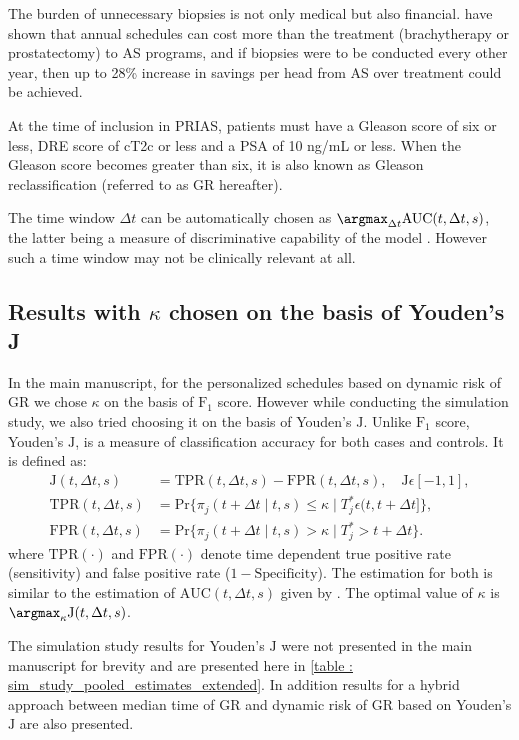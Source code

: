 The burden of unnecessary biopsies is not only medical but also financial. \citet{keegan2012active} have shown that annual schedules can cost more than the treatment (brachytherapy or prostatectomy) to AS programs, and if biopsies were to be conducted every other year, then up to 28\% increase in savings per head from AS over treatment could be achieved.

At the time of inclusion in PRIAS, patients must have a Gleason score of six or less, DRE score of cT2c or less and a PSA of 10 ng/mL or less. When the Gleason score becomes greater than six, it is also known as Gleason reclassification (referred to as GR hereafter).

The time window $\Delta t$ can be automatically chosen as $\argmax_{\Delta t}\mbox{AUC}(t, \Delta t, s)$, the latter being a measure of discriminative capability of the model \citep{rizopoulosJMbayes,landmarking2017}. However such a time window may not be clinically relevant at all. 

\subsection{Results with $\kappa$ chosen on the basis of Youden's J}
In the main manuscript, for the personalized schedules based on dynamic risk of GR we chose $\kappa$ on the basis of $\mbox{F}_1$ score. However while conducting the simulation study, we also tried choosing it on the basis of Youden's $\mbox{J}$. Unlike $\mbox{F}_1$ score, Youden's $\mbox{J}$, is a measure of classification accuracy for both cases and controls. It is defined as:
\begin{align*}
\mbox{J}(t, \Delta t, s) &= \text{TPR}(t, \Delta t, s) - \text{FPR}(t, \Delta t, s), \quad \mbox{J}\epsilon [-1,1],\\
\text{TPR}(t, \Delta t, s) &= \mbox{Pr}\big\{\pi_j(t + \Delta t \mid t,s) \leq \kappa \mid T^*_j \epsilon (t, t + \Delta t]\big\},\\
\text{FPR}(t, \Delta t, s) &= \mbox{Pr}\big\{\pi_j(t + \Delta t \mid t,s) > \kappa \mid T^*_j > t + \Delta t \big\}.
\end{align*}
where $\mbox{TPR}(\cdot)$ and $\mbox{FPR}(\cdot)$ denote time dependent true positive rate (sensitivity) and false positive rate ($1 - \mbox{Specificity}$). The estimation for both is similar to the estimation of $\mbox{AUC}(t, \Delta t, s)$ given by \citet{landmarking2017}. The optimal value of $\kappa$ is $\argmax_{\kappa} \mbox{J}(t, \Delta t, s)$.

The simulation study results for Youden's $\mbox{J}$ were not presented in the main manuscript for brevity and are presented here in \ref{table : sim_study_pooled_estimates_extended}. In addition results for a hybrid approach between median time of GR and dynamic risk of GR based on Youden's $\mbox{J}$ are also presented. 

